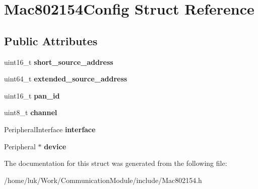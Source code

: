 \hypertarget{structMac802154Config}{}\section{Mac802154\+Config Struct Reference}
\label{structMac802154Config}
\subsection*{Public Attributes}
\begin{DoxyCompactItemize}
\item 
\mbox{\label{structMac802154Config_a4385613ab09e716adfd378be386aa791}} 
uint16\+\_\+t {\bfseries short\+\_\+source\+\_\+address}
\item 
\mbox{\label{structMac802154Config_ab9c6f91d04aa353d54055fade1d63edb}} 
uint64\+\_\+t {\bfseries extended\+\_\+source\+\_\+address}
\item 
\mbox{\label{structMac802154Config_a5733461f2b66deb2f219764a00591047}} 
uint16\+\_\+t {\bfseries pan\+\_\+id}
\item 
\mbox{\label{structMac802154Config_a1684073f62610be75cee57d924ee3b19}} 
uint8\+\_\+t {\bfseries channel}
\item 
\mbox{\label{structMac802154Config_add580d0e39805f81ed926479082c06e8}} 
Peripheral\+Interface {\bfseries interface}
\item 
\mbox{\label{structMac802154Config_aeabf838cbed33d09beae1a6ac51596cb}} 
Peripheral $\ast$ {\bfseries device}
\end{DoxyCompactItemize}


The documentation for this struct was generated from the following file\+:\begin{DoxyCompactItemize}
\item 
/home/luk/\+Work/\+Communication\+Module/include/Mac802154.\+h\end{DoxyCompactItemize}
